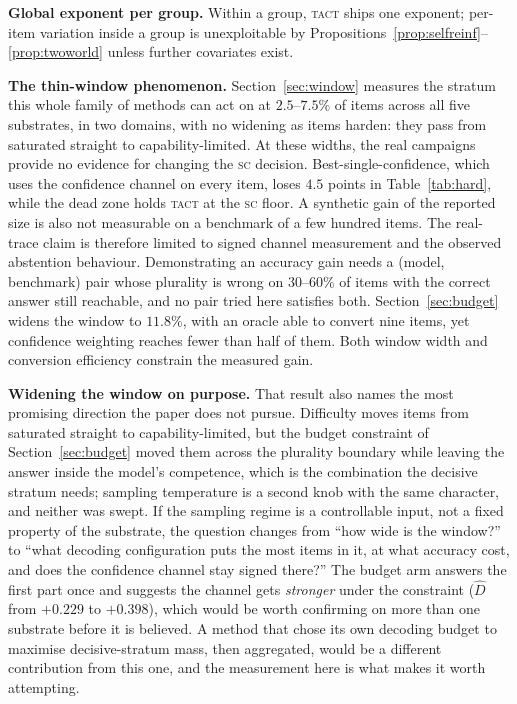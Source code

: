 \documentclass[conference]{IEEEtran}
\newcommand{\Dhat}{\widehat{D}}
\newcommand{\SC}{\textsc{sc}}
\newcommand{\TACT}{\textsc{tact}}
\begin{document}
\textbf{Global exponent per group.} Within a group, \TACT{} ships one exponent; per-item variation inside a group is unexploitable by Propositions~\ref{prop:selfreinf}--\ref{prop:twoworld} unless further covariates exist.

\textbf{The thin-window phenomenon.} Section~\ref{sec:window} measures the stratum this
whole family of methods can act on at $2.5$--$7.5\%$ of items across all five
substrates, in two domains, with no widening as items harden: they pass from
saturated straight to capability-limited. At these widths, the real campaigns
provide no evidence for changing the \SC{} decision. Best-single-confidence,
which uses the confidence channel on every item, loses $4.5$ points in Table~\ref{tab:hard},
while the dead zone holds \TACT{} at the \SC{} floor. A synthetic gain of the
reported size is also not measurable on a benchmark of a few hundred items.
The real-trace claim is therefore limited to signed channel measurement and
the observed abstention behaviour. Demonstrating an accuracy gain needs a (model, benchmark)
pair whose plurality is wrong on $30$--$60\%$ of items with the correct answer
still reachable, and no pair tried here satisfies both.
Section~\ref{sec:budget} widens the window to $11.8\%$, with an oracle able to
convert nine items, yet confidence weighting reaches fewer than half of them.
Both window width and conversion efficiency constrain the measured gain.

\textbf{Widening the window on purpose.} That result also names the most
promising direction the paper does not pursue. Difficulty moves items from
saturated straight to capability-limited, but the budget constraint of
Section~\ref{sec:budget} moved them across the plurality boundary while leaving
the answer inside the model's competence, which is the combination the decisive
stratum needs; sampling temperature is a second knob with the same character,
and neither was swept. If the sampling regime is a controllable input, not a fixed property
of the substrate, the question changes from ``how wide is
the window?'' to ``what decoding configuration puts the most items in it, at
what accuracy cost, and does the confidence channel stay signed there?'' The
budget arm answers the first part once and suggests the channel gets
\emph{stronger} under the constraint ($\Dhat$ from $+0.229$ to $+0.398$), which
would be worth confirming on more than one substrate before it is believed. A
method that chose its own decoding budget to maximise decisive-stratum mass,
then aggregated, would be a different contribution from this one, and the
measurement here is what makes it worth attempting.
\end{document}
